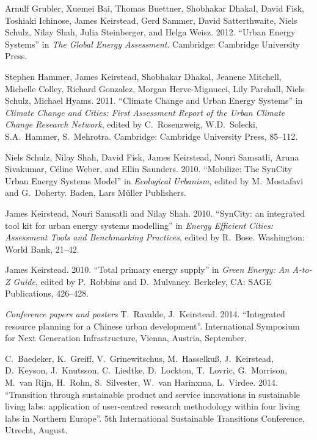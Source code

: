 \documentclass[11pt,a4paper]{article}
\begin{document}
\ind Arnulf Grubler, Xuemei Bai, Thomas Buettner, Shobhakar Dhakal, David Fisk, Toshiaki Ichinose, James Keirstead, Gerd Sammer, David Satterthwaite, Niels Schulz, Nilay Shah, Julia Steinberger, and Helga Weisz. 2012. ``Urban Energy Systems'' in \emph{The Global Energy Assessment}. Cambridge: Cambridge University Press.

\ind Stephen Hammer, James Keirstead, Shobhakar Dhakal, Jeanene Mitchell, Michelle Colley, Richard Gonzalez, Morgan Herve-Mignucci, Lily Parshall, Niels Schulz, Michael Hyams. 2011. ``Climate Change and Urban Energy Systems'' in \emph{Climate Change and Cities: First Assessment Report of the Urban Climate Change Research Network}, edited by C.\ Rosenzweig, W.D.\ Solecki, S.A.\ Hammer, S.\ Mehrotra.  Cambridge: Cambridge University Press, 85--112.

\ind Niels Schulz, Nilay Shah, David Fisk, James Keirstead, Nouri Samsatli, Aruna Sivakumar, C\'{e}line Weber, and Ellin Saunders. 2010. ``Mobilize: The SynCity Urban Energy Systems Model'' in \emph{Ecological Urbanism}, edited by M.\ Mostafavi and G.\ Doherty.  Baden, Lars M\"{u}ller Publishers.

\ind James Keirstead, Nouri Samsatli and Nilay Shah. 2010. ``SynCity: an integrated tool kit for urban energy systems modelling'' in \emph{Energy Efficient Cities: Assessment Tools and Benchmarking Practices}, edited by R.\ Bose.  Washington: World Bank, 21--42.

\ind James Keirstead. 2010. ``Total primary energy supply'' in \emph{Green Energy: An A-to-Z Guide}, edited by P.\ Robbins and D.\ Mulvaney.  Berkeley, CA: SAGE Publications, 426--428.


\bigskip 

\noindent\emph{Conference papers and posters\vspace{0.01in}}
%
%
%
%
\ind T.\ Ravalde,  J.\ Keirstead. 2014. ``Integrated resource planning for a Chinese urban development''. International Symposium for Next Generation Infrastructure, Vienna, Austria, September.

\ind C.\ Baedeker, K.\ Greiff, V.\ Grinewitschus, M.\ Hasselku{\ss}, J.\ Keirstead, D.\ Keyson, J.\ Knutsson, C.\ Liedtke, D.\ Lockton, T.\ Lovric, G.\ Morrison, M.\ van Rijn, H.\ Rohn, S.\ Silvester, W.\ van Harinxma, L.\ Virdee. 2014. ``Transition through sustainable product and service innovations in sustainable living labs: application of user-centred research methodology within four living labs in Northern Europe''.  5th International Sustainable Transitions Conference, Utrecht, August. %
\end{document}
